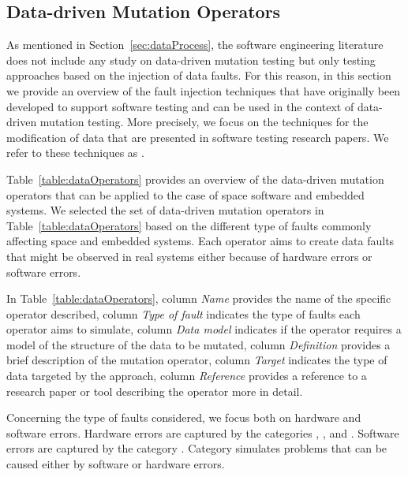 
\subsection{Data-driven Mutation Operators}
\label{sec:data_operators}

As mentioned in Section~\ref{sec:dataProcess}, the software engineering literature does not include any study on data-driven mutation testing but only testing approaches based on the injection of data faults.
For this reason, 
in this section we provide an overview of the fault injection techniques that have originally been developed to support software testing and can be used in the context of data-driven mutation testing. 
More precisely, we focus on the techniques for the modification of data that are presented in software testing research papers.
We refer to these techniques as .

Table~\ref{table:dataOperators} provides an overview of the data-driven mutation operators that can be applied to the case of space software and embedded systems. 
We selected the set of data-driven mutation operators in Table~\ref{table:dataOperators} based on the different type of faults commonly affecting space and embedded systems. 
Each operator aims to create data faults that might be observed in real systems either because of hardware errors or software errors.

In Table~\ref{table:dataOperators}, column \emph{Name} provides the name of the specific operator described,  
 column \emph{Type of fault} indicates the type of faults each operator aims to simulate,
 column \emph{Data model} indicates if the operator requires a model of the structure of the data to be mutated,
 column \emph{Definition} provides a brief description of the mutation operator, column \emph{Target} indicates the type of data targeted by the approach,
 column \emph{Reference} provides a reference to a research paper or tool describing the operator more in detail.
 
Concerning the type of faults considered, we focus both on hardware and software errors.
Hardware errors are captured by the categories , , and . 
Software errors are captured by the category .
Category  simulates problems that can be caused either by software or hardware errors.

